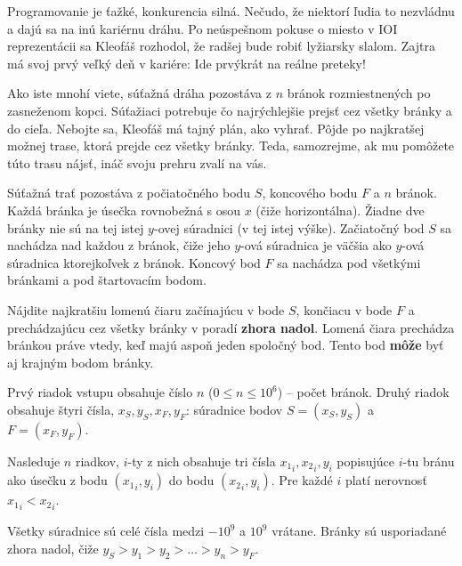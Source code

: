 
\usepackage[slovak]{babel}





Programovanie je ťažké, konkurencia silná. Nečudo, že niektorí ľudia to nezvládnu
a dajú sa na inú kariérnu dráhu. Po neúspešnom pokuse o miesto v IOI reprezentácii
sa Kleofáš rozhodol, že radšej bude robiť lyžiarsky slalom. Zajtra má svoj prvý
veľký deň v kariére: Ide prvýkrát na reálne preteky!

Ako iste mnohí viete, súťažná dráha pozostáva z $n$ bránok rozmiestnených po
zasneženom kopci. Súťažiaci potrebuje čo najrýchlejšie prejsť cez všetky bránky a do cieľa.
Nebojte sa, Kleofáš má tajný plán, ako vyhrať. Pôjde po najkratšej možnej trase,
ktorá prejde cez všetky bránky. Teda, samozrejme, ak mu pomôžete túto trasu nájsť,
ináč svoju prehru zvalí na vás.


Súťažná trať pozostáva z počiatočného bodu $S$, koncového bodu $F$ a $n$ bránok.
Každá bránka je úsečka rovnobežná s osou $x$ (čiže horizontálna). Žiadne dve bránky
nie sú na tej istej $y$-ovej súradnici (v tej istej výške). Začiatočný bod $S$ sa
nachádza nad každou z bránok, čiže jeho $y$-ová súradnica je väčšia ako $y$-ová
súradnica ktorejkoľvek z bránok. Koncový bod $F$ sa nachádza pod všetkými bránkami a 
pod štartovacím bodom.

Nájdite najkratšiu lomenú čiaru začínajúcu v bode $S$, končiacu v bode $F$ a prechádzajúcu
cez všetky bránky v poradí \textbf{zhora nadol}. Lomená čiara prechádza bránkou práve vtedy,
keď majú aspoň jeden spoločný bod. Tento bod \textbf{môže} byť aj krajným bodom bránky.


Prvý riadok vstupu obsahuje číslo $n$ ($0 \leq n \leq 10^6$) -- počet bránok.
Druhý riadok obsahuje štyri čísla, $x_S, y_S, x_F, y_F$: súradnice bodov $S = (x_S, y_S)$
a $F = (x_F, y_F)$.

Nasleduje $n$ riadkov, $i$-ty z nich obsahuje tri čísla ${x_1}_i, {x_2}_i, {y}_i$ popisujúce $i$-tu
bránu ako úsečku z bodu $({x_1}_i, y_i)$ do bodu $({x_2}_i, y_i)$. Pre každé $i$ platí nerovnosť
${x_1}_i < {x_2}_i$.

Všetky súradnice sú celé čísla medzi $-10^9$ a $10^9$ vrátane. Bránky sú usporiadané zhora
nadol, čiže $y_S > y_1 > y_2 > \dots > y_n > y_F$.


